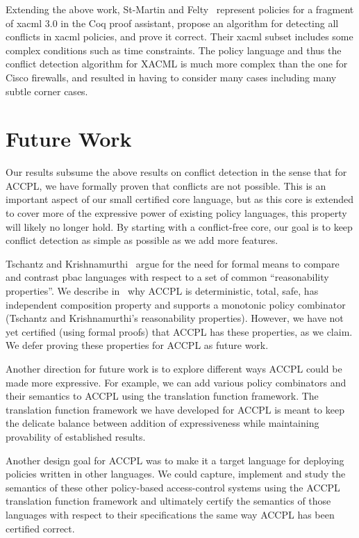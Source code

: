 \documentclass[runningheads,a4paper]{llncs}
\begin{document}
Extending the above work, St-Martin and Felty~\cite{felty16} represent
policies for a fragment of \ac{xacml} 3.0 in the Coq proof assistant,
propose an algorithm for detecting all conflicts in \ac{xacml}
policies, and prove it correct. Their \ac{xacml} subset includes some
complex conditions such as time constraints. The policy language and
thus the conflict detection algorithm for XACML is much more complex
than the one for Cisco firewalls, and resulted in having to consider
many cases including many subtle corner cases.

\section{Future Work}


Our results subsume the above results on conflict detection in the
sense that for \ac{ACCPL}, we have formally proven that conflicts are
not possible.  This is an important aspect of our small certified core
language, but as this core is extended to cover more of the expressive
power of existing policy languages, this property will likely no
longer hold.  By starting with a conflict-free core, our goal is to
keep conflict detection as simple as possible as we add more features.

Tschantz and Krishnamurthi~\cite{Tschantz} argue for the need for formal means to compare and contrast \ac{pbac} languages with respect to a set of common ``reasonability properties''. We describe in~\cite{BahPhd} why \ac{ACCPL} is deterministic, total, safe, has independent composition property and supports a monotonic policy combinator (Tschantz and Krishnamurthi's reasonability properties). However, we have not yet certified (using formal proofs) that \ac{ACCPL} has these properties, as we claim. We defer proving these properties for \ac{ACCPL} as future work. 

Another direction for future work is to explore different ways \ac{ACCPL} could be made more expressive. For example, we can add various policy combinators and their semantics to \ac{ACCPL} using the translation function framework. The translation function framework we have developed for \ac{ACCPL} is meant to keep the delicate balance between addition of expressiveness while maintaining provability of established results.

Another design goal for \ac{ACCPL} was to make it a target language for deploying policies written in other languages. We could capture, implement and study the semantics of these other policy-based access-control systems using the \ac{ACCPL} translation function framework and ultimately certify the semantics of those languages with respect to their specifications the same way \ac{ACCPL} has been certified correct. 
\end{document}
